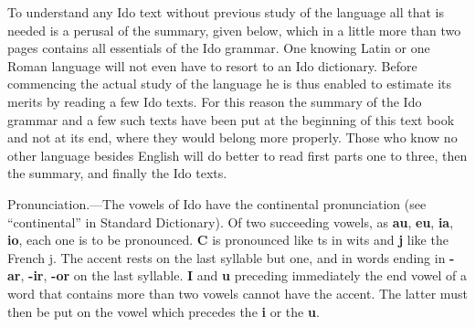 To understand any Ido text without previous study of the language all that is needed is a perusal of the summary, given below, which in a little more than two pages contains all essentials of the Ido grammar. One knowing Latin or one Roman language will not even have to resort to an Ido dictionary. Before commencing the actual study of the language he is thus enabled to estimate its merits by reading a few Ido texts. For this reason the summary of the Ido grammar and a few such texts have been put at the beginning of this text book and not at its end, where they would belong more properly. Those who know no other language besides English will do better to read first parts one to three, then the summary, and finally the Ido texts. 

Pronunciation.—The vowels of Ido have the continental pronunciation (see “continental” in Standard Dictionary). Of two succeeding vowels, as \textbf{au}, \textbf{eu}, \textbf{ia}, \textbf{io}, each one is to be pronounced. \textbf{C} is pronounced like ts in wits and \textbf{j} like the French j. The accent rests on the last syllable but one, and in words ending in \textbf{-ar}, \textbf{-ir}, \textbf{-or} on the last syllable. \textbf{I} and \textbf{u} preceding immediately the end vowel of a word that contains more than two vowels cannot have the accent. The latter must then be put on the vowel which precedes the \textbf{i} or the \textbf{u}. 

